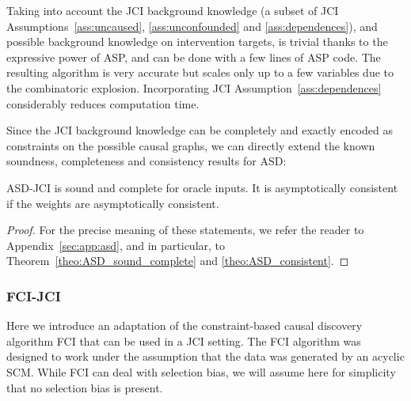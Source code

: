 \documentclass[twoside,11pt]{article}
\begin{document}
Taking into account the JCI background knowledge (a subset of JCI Assumptions~\ref{ass:uncaused}, \ref{ass:unconfounded}
and \ref{ass:dependences}), and possible background knowledge on intervention targets, 
is trivial thanks to the expressive power of ASP, and can be 
done with a few lines of ASP code. The resulting algorithm is very accurate but scales only
up to a few variables due to the combinatoric explosion. 
Incorporating JCI Assumption~\ref{ass:dependences} considerably reduces computation time. 
%

Since the JCI background knowledge can be completely and exactly encoded as constraints on the possible
causal graphs, we can directly extend the known soundness, completeness and consistency results for ASD:
\begin{theorem}\label{eq:ASDJCI_sound_complete_consistent}
  ASD-JCI is sound and complete for oracle inputs. 
  It is asymptotically consistent if the weights are asymptotically consistent.
\end{theorem}
\begin{proof}
  For the precise meaning of these statements, we refer the reader to Appendix~\ref{sec:app:asd}, and in particular, to Theorem~\ref{theo:ASD_sound_complete} and \ref{theo:ASD_consistent}.
\end{proof}

\subsubsection{FCI-JCI}\label{sec:FCI-JCI}

Here we introduce an adaptation of the constraint-based causal discovery algorithm FCI \citep{SMR1999,Zhang2008_AI} that can be used in a JCI setting. The FCI algorithm was designed to work under the assumption that the data was generated by an acyclic SCM.
While FCI can deal with selection bias, we will assume here for simplicity that no selection bias is present.
\end{document}
